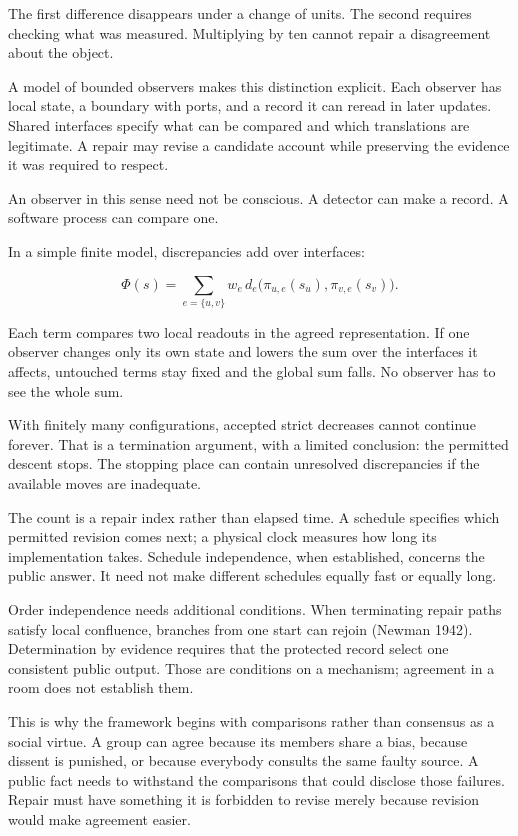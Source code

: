 \documentclass[
  11pt,
]{article}
\begin{document}
The first difference disappears under a change of units. The second
requires checking what was measured. Multiplying by ten cannot repair a
disagreement about the object.

A model of bounded observers makes this distinction explicit. Each
observer has local state, a boundary with ports, and a record it can
reread in later updates. Shared interfaces specify what can be compared
and which translations are legitimate. A repair may revise a candidate
account while preserving the evidence it was required to respect.

An observer in this sense need not be conscious. A detector can make a
record. A software process can compare one.

In a simple finite model, discrepancies add over interfaces:

\[
  \Phi(s)=\sum_{e=\{u,v\}} w_e\,
  d_e\bigl(\pi_{u,e}(s_u),\pi_{v,e}(s_v)\bigr).
\]

Each term compares two local readouts in the agreed representation. If
one observer changes only its own state and lowers the sum over the
interfaces it affects, untouched terms stay fixed and the global sum
falls. No observer has to see the whole sum.

With finitely many configurations, accepted strict decreases cannot
continue forever. That is a termination argument, with a limited
conclusion: the permitted descent stops. The stopping place can contain
unresolved discrepancies if the available moves are inadequate.

The count is a repair index rather than elapsed time. A schedule
specifies which permitted revision comes next; a physical clock measures
how long its implementation takes. Schedule independence, when
established, concerns the public answer. It need not make different
schedules equally fast or equally long.

Order independence needs additional conditions. When terminating repair
paths satisfy local confluence, branches from one start can rejoin
(Newman 1942). Determination by evidence requires that the protected
record select one consistent public output. Those are conditions on a
mechanism; agreement in a room does not establish them.

This is why the framework begins with comparisons rather than consensus
as a social virtue. A group can agree because its members share a bias,
because dissent is punished, or because everybody consults the same
faulty source. A public fact needs to withstand the comparisons that
could disclose those failures. Repair must have something it is
forbidden to revise merely because revision would make agreement easier.
\end{document}
